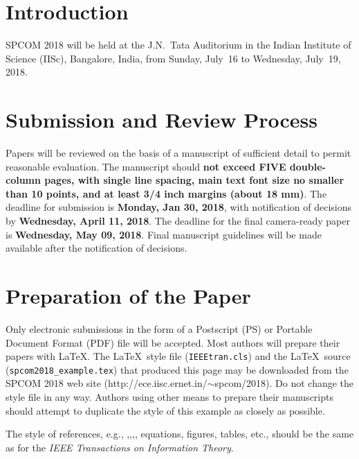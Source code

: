 \documentclass[10pt,conference]{IEEEtran}
\begin{document}
\section{Introduction}
SPCOM 2018 will be held at the J.N.~Tata Auditorium in the 
Indian Institute of Science (IISc), Bangalore, India, from Sunday, July~16 to
Wednesday, July~19, 2018.



\section{Submission and Review Process}
Papers will be reviewed on the basis of a manuscript of sufficient
detail to permit reasonable evaluation. The manuscript should {\bf
not exceed {\bf FIVE} double-column pages, with single line spacing, main
text font size no smaller than 10 points, and at least 3/4 inch
margins (about 18 mm)}. The deadline for submission is {\bf Monday, Jan 30, 2018}, with notification of decisions by {\bf Wednesday, April 11, 2018}. The deadline for the final camera-ready paper is {\bf Wednesday, May 09, 2018}. 
Final manuscript guidelines will be made available after the notification of decisions.



\section{Preparation of the Paper}
Only electronic submissions in the form of a Postscript (PS) or Portable
Document Format (PDF) file will be accepted. Most authors will
prepare their papers with \LaTeX. The \LaTeX\ style file
(\verb#IEEEtran.cls#) and the \LaTeX\ source
(\verb#spcom2018_example.tex#) that produced this page may be
downloaded from the SPCOM 2018 web site
(http://ece.iisc.ernet.in/$\sim$spcom/2018). Do not change the style file
in any way. 
Authors using other means to prepare their manuscripts
should attempt to duplicate the style of this example as closely as
possible.

The style of references, 
e.g.,
\cite{Shannon1948},\cite{Kalman1960},\cite{Rao2008},\cite{Mhatre2009}, 
equations, figures, tables, etc.,
should be the same as for the \emph{IEEE Transactions on Information
Theory}. 
\end{document}
